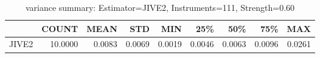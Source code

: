 \begin{table}[ht]
\centering
\caption{variance summary: Estimator=JIVE2, Instruments=111, Strength=0.60}
\begin{tabular}{lrrrrrrrr}
\toprule
 & COUNT & MEAN & STD & MIN & 25\% & 50\% & 75\% & MAX \\
\midrule
JIVE2 & 10.0000 & 0.0083 & 0.0069 & 0.0019 & 0.0046 & 0.0063 & 0.0096 & 0.0261 \\
\bottomrule
\end{tabular}
\end{table}
